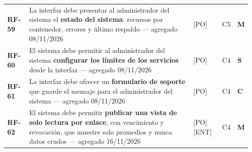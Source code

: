 \begin{longtable}{@{}C{1.3cm}L{6.1cm}L{1.6cm}L{1.2cm}C{0.7cm}@{}}
\textbf{RF-59} & La interfaz debe presentar al administrador del sistema el \textbf{estado del sistema}: recursos por contenedor, errores y último respaldo --- agregado 08/11/2026 & [PO] & C5 & \textbf{M} \\
\textbf{RF-60} & El sistema debe permitir al administrador del sistema \textbf{configurar los límites de los servicios} desde la interfaz --- agregado 08/11/2026 & [PO] & C4 & \textbf{S} \\
\textbf{RF-61} & La interfaz debe ofrecer un \textbf{formulario de soporte} que guarde el mensaje para el administrador del sistema --- agregado 08/11/2026 & [PO] & C4 & \textbf{C} \\
\textbf{RF-62} & El sistema debe permitir \textbf{publicar una vista de solo lectura por enlace}, con vencimiento y revocación, que muestre solo promedios y nunca datos crudos --- agregado 16/11/2026 & [PO] [ENT] & C4 & \textbf{M} \\
\end{longtable}

